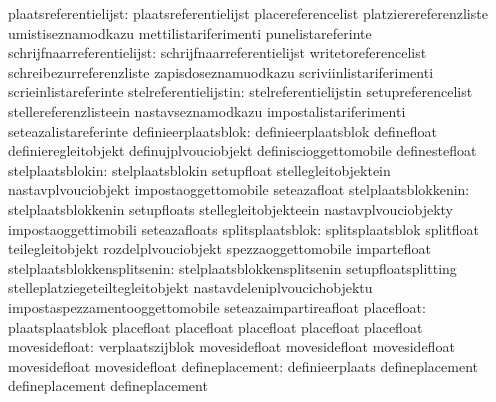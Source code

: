            plaatsreferentielijst: plaatsreferentielijst            placereferencelist
                                  platzierereferenzliste           umistiseznamodkazu
                                  mettilistariferimenti            punelistareferinte
      schrijfnaarreferentielijst: schrijfnaarreferentielijst       writetoreferencelist
                                  schreibezurreferenzliste         zapisdoseznamuodkazu
                                  scriviinlistariferimenti         scrieinlistareferinte
           stelreferentielijstin: stelreferentielijstin            setupreferencelist
                                  stellereferenzlisteein           nastavseznamodkazu
                                  impostalistariferimenti          seteazalistareferinte
             definieerplaatsblok: definieerplaatsblok              definefloat
                                  definieregleitobjekt             definujplvouciobjekt
                                  definiscioggettomobile           definestefloat
                stelplaatsblokin: stelplaatsblokin                 setupfloat
                                  stellegleitobjektein             nastavplvouciobjekt
                                  impostaoggettomobile             seteazafloat
             stelplaatsblokkenin: stelplaatsblokkenin              setupfloats
                                  stellegleitobjekteein            nastavplvouciobjekty
                                  impostaoggettimobili             seteazafloats
                splitsplaatsblok: splitsplaatsblok                 splitfloat
                                  teilegleitobjekt                 rozdelplvouciobjekt
                                  spezzaoggettomobile              impartefloat
     stelplaatsblokkensplitsenin: stelplaatsblokkensplitsenin      setupfloatsplitting
                                  stelleplatziegeteiltegleitobjekt nastavdeleniplvoucichobjektu
                                  impostaspezzamentooggettomobile  seteazaimpartireafloat
                      placefloat: plaatsplaatsblok                 placefloat
                                  placefloat                       placefloat
                                  placefloat                       placefloat %
  movesidefloat: verplaatszijblok                 movesidefloat
                 movesidefloat                    movesidefloat
                 movesidefloat                    movesidefloat
defineplacement: definieerplaats                  defineplacement
                 defineplacement                  defineplacement

